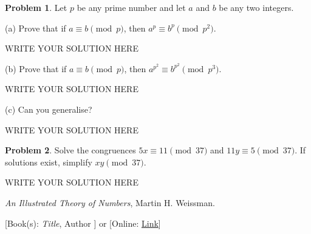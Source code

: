 \documentclass[11pt]{article}
\theoremstyle{plain}
\theoremstyle{definition}
\newtheorem{problem}{Problem}
\theoremstyle{remark}
\numberwithin{equation}{problem}
\begin{document}
\begin{problem}
	Let $p$ be any prime number and let $a$ and $b$ be any two integers.
	\begin{listinprob}
	\item[(a)] Prove that if $a \equiv b \pmod{p}$, then $a^p \equiv b^p \pmod{p^2}$.
\begin{solution} %
WRITE YOUR SOLUTION HERE
\end{solution}\clearpage %
	\item[(b)] Prove that if $a \equiv b \pmod{p}$, then $a^{p^2} \equiv b^{p^2} \pmod{p^3}$.
\begin{solution} %
WRITE YOUR SOLUTION HERE
\end{solution}\clearpage %
	\item[(c)] Can you generalise?
\begin{solution} %
WRITE YOUR SOLUTION HERE
\end{solution}\clearpage %
	\end{listinprob}
\end{problem}




\begin{problem}
	Solve the congruences $5x \equiv 11\pmod{37}$ and $11y \equiv 5\pmod{37}$. If solutions exist, simplify $xy\pmod{37}$.
\begin{solution} %
WRITE YOUR SOLUTION HERE
\end{solution}\clearpage %
\end{problem}



\begin{thebibliography}{9}  %
\emph{An Illustrated Theory of Numbers}, Martin H. Weissman.

[Book(s): \emph{Title}, Author ] or [Online: \href{http://example.com/}{Link}]
\end{thebibliography}  %
\end{document}
